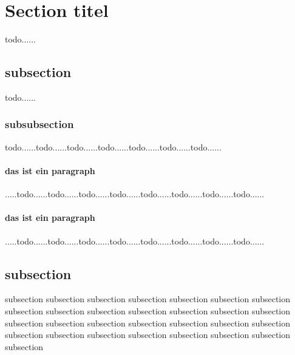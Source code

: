 \section{Section titel}

todo......

\subsection{subsection}

todo......

\subsubsection{subsubsection}
\label{sec:subsectionlabelforreference}
todo......todo......todo......todo......todo......todo......todo......

\paragraph{das ist ein paragraph}
.....todo......todo......todo......todo......todo......todo......todo......todo......

\paragraph{das ist ein paragraph}
.....todo......todo......todo......todo......todo......todo......todo......todo......



\subsection{subsection}
\label{sub:subsection}

subsection subsection subsection subsection subsection subsection subsection subsection subsection subsection subsection subsection subsection subsection subsection subsection subsection subsection subsection subsection subsection subsection subsection subsection subsection subsection subsection subsection subsection